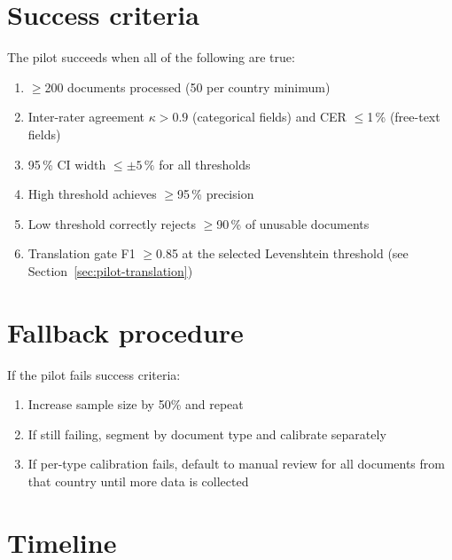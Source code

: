 \documentclass[11pt,a4paper,twoside]{report}
\begin{document}
\section{Success criteria}\label{sec:pilot-success}

The pilot succeeds when all of the following are true:
\begin{enumerate}
  \item $\geq$200 documents processed (50 per country minimum)
  \item Inter-rater agreement $\kappa > 0.9$ (categorical fields)
        and CER $\le$1\,\% (free-text fields)
  \item 95\,\% CI width $\leq \pm 5\,\%$ for all thresholds
  \item High threshold achieves $\geq$95\,\% precision
  \item Low threshold correctly rejects $\geq$90\,\% of unusable documents
  \item Translation gate F1 $\geq$0.85 at the selected Levenshtein
        threshold (see Section~\ref{sec:pilot-translation})
\end{enumerate}

\section{Fallback procedure}

If the pilot fails success criteria:
\begin{enumerate}
  \item Increase sample size by 50\% and repeat
  \item If still failing, segment by document type and calibrate separately
  \item If per-type calibration fails, default to manual review for all
        documents from that country until more data is collected
\end{enumerate}

\section{Timeline}\label{sec:pilot-timeline}
\end{document}
